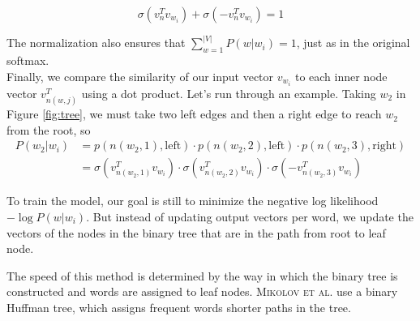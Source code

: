 \documentclass[nobib]{tufte-handout}
\begin{document}
$$ \sigma(v_n^T v_{w_i}) + \sigma(- v_n^T v_{w_i}) = 1 $$ 

The normalization also ensures that $ \sum_{w=1}^{|V|} P(w| w_i) = 1 $, just as in the original softmax. \\
Finally, we compare the similarity of our input vector $v_{w_i}$ to each inner node vector $v^T_{n(w,j)}$ using a dot product. 
Let's run through an example. Taking $w_2$ in Figure \ref{fig:tree}, we must take two left edges and then a right edge to reach $w_2$ from the root, so 
\begin{align*}
 P(w_2 | w_i) &= p(n(w_2,1), \text{left}) \cdot p(n(w_2,2), \text{left}) \cdot p(n(w_2, 3), \text{right}) \\
&= \sigma(v^T_{n(w_2,1)} v_{w_i}) \cdot  \sigma(v^T_{n(w_2,2)} v_{w_i}) \cdot
\sigma(-v^T_{n(w_2,3)} v_{w_i})
\end{align*}


To train the model, our goal is still to minimize the negative log likelihood $ - \log P(w| w_i) $. But instead of updating output vectors per word, we update the vectors of the nodes in the binary tree that are in the path from root to leaf node.  

The speed of this method is determined by the way in which the binary tree is constructed and words are assigned to leaf nodes. \textsc{Mikolov et al.}  use a binary Huffman tree, which assigns frequent words shorter paths in the tree. 









\nocite{*}
\footnotesize


\end{document}
